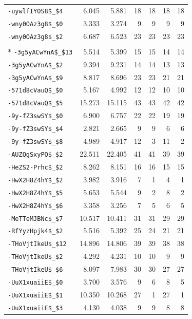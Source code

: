 \begin{longtable}{lrrrrrr}
\nolinkurl{-uywlfIYOS8$_$4} & 6.045 & 5.881 & 18 & 18 & 18 & 18\\
\nolinkurl{-wny0OAz3g8$_$0} & 3.333 & 3.274 & 9 & 9 & 9 & 9\\
\nolinkurl{-wny0OAz3g8$_$2} & 6.687 & 6.523 & 23 & 23 & 23 & 23\\
\addlinespace[0.5em]
\multicolumn{7}{l}{\textbf{2. 部分词通过筛选且三种模态都可观测（46条）}}\\*
\nolinkurl{-3g5yACwYnA$_$13} & 5.514 & 5.399 & 15 & 15 & 14 & 14\\
\nolinkurl{-3g5yACwYnA$_$2} & 9.394 & 9.231 & 14 & 14 & 13 & 13\\
\nolinkurl{-3g5yACwYnA$_$9} & 8.817 & 8.696 & 23 & 23 & 21 & 21\\
\nolinkurl{-571d8cVauQ$_$0} & 5.167 & 4.992 & 12 & 12 & 10 & 10\\
\nolinkurl{-571d8cVauQ$_$5} & 15.273 & 15.115 & 43 & 43 & 42 & 42\\
\nolinkurl{-9y-fZ3swSY$_$0} & 6.900 & 6.757 & 22 & 22 & 19 & 19\\
\nolinkurl{-9y-fZ3swSY$_$4} & 2.821 & 2.665 & 9 & 9 & 6 & 6\\
\nolinkurl{-9y-fZ3swSY$_$8} & 4.989 & 4.917 & 12 & 3 & 11 & 2\\
\nolinkurl{-AUZQgSxyPQ$_$2} & 22.511 & 22.405 & 41 & 41 & 39 & 39\\
\nolinkurl{-HeZS2-Prhc$_$2} & 8.262 & 8.151 & 16 & 16 & 15 & 15\\
\nolinkurl{-HwX2H8Z4hY$_$2} & 3.982 & 3.916 & 7 & 1 & 4 & 1\\
\nolinkurl{-HwX2H8Z4hY$_$5} & 5.653 & 5.544 & 9 & 2 & 8 & 2\\
\nolinkurl{-HwX2H8Z4hY$_$6} & 3.358 & 3.256 & 7 & 5 & 6 & 5\\
\nolinkurl{-MeTTeMJBNc$_$7} & 10.517 & 10.411 & 31 & 31 & 29 & 29\\
\nolinkurl{-RfYyzHpjk4$_$2} & 5.516 & 5.392 & 25 & 24 & 21 & 21\\
\nolinkurl{-THoVjtIkeU$_$12} & 14.896 & 14.806 & 39 & 39 & 38 & 38\\
\nolinkurl{-THoVjtIkeU$_$2} & 4.292 & 4.231 & 10 & 10 & 9 & 9\\
\nolinkurl{-THoVjtIkeU$_$6} & 8.097 & 7.983 & 30 & 30 & 27 & 27\\
\nolinkurl{-UuX1xuaiiE$_$0} & 3.700 & 3.576 & 9 & 6 & 8 & 5\\
\nolinkurl{-UuX1xuaiiE$_$1} & 10.350 & 10.268 & 27 & 1 & 27 & 1\\
\nolinkurl{-UuX1xuaiiE$_$3} & 4.130 & 4.038 & 9 & 9 & 8 & 8\\

\end{longtable}
